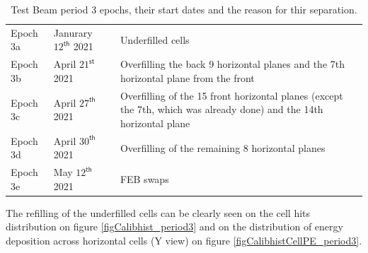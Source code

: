 \documentclass[12pt,a4paper]{article}
\begin{document}
\begin{table}[!ht]
\centering
\def\arraystretch{1.4}
\begin{tabular}{m{} m{} m{}}
Epoch 3a & Janurary $12^{\textsf{th}}$ 2021 & Underfilled cells\\
Epoch 3b & April $21^{\textsf{st}}$ 2021 & Overfilling the back 9 horizontal planes and the 7th horizontal plane from the front\\
Epoch 3c & April $27^{\textsf{th}}$ 2021 & Overfilling of the 15 front horizontal planes (except the 7th, which was already done) and the 14th horizontal plane\\
Epoch 3d & April $30^{\textsf{th}}$ 2021 & Overfilling of the remaining 8 horizontal planes\\
Epoch 3e & May $12^{\textsf{th}}$ 2021 & FEB swaps
\end{tabular}
\caption{Test Beam period 3 epochs, their start dates and the reason for thir separation.}
\label{tabTestBeamPeriod3Epochs}
\end{table}

The refilling of the underfilled cells can be clearly seen on the cell hits distribution on figure \ref{figCalibhist_period3} and on the distribution of energy deposition across horizontal cells (Y view) on figure \ref{figCalibhistCellPE_period3}.
\end{document}
